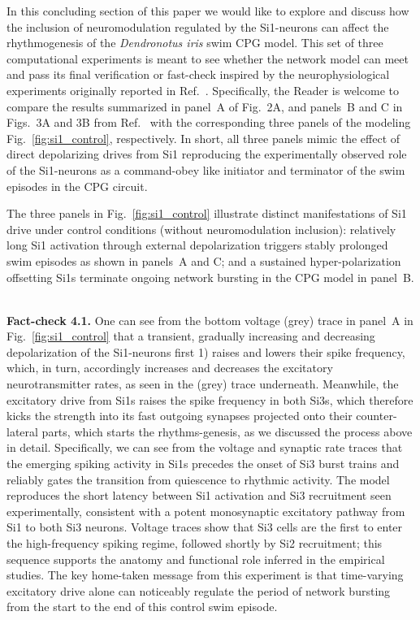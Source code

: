 \documentclass[nofootinbib,aip,amsmath,amssymb,reprint,twocolumn,10pt]{revtex4-2}
\begin{document}
In this concluding section of this paper we would like to explore and discuss how the inclusion of 
neuromodulation regulated by the Si1-neurons can affect the rhythmogenesis of the {\textit{Dendronotus iris}} 
swim CPG model. This set of three computational experiments is meant to see whether the network model can meet and pass its final verification or fast-check inspired by the neurophysiological experiments originally reported in Ref.~\cite{sakurai2019command}. Specifically, the Reader is welcome to compare the results summarized in panel~A of Fig.~2A, and panels~B and C in Figs.~3A and 3B from Ref.~\cite{sakurai2019command} with the  corresponding three panels of the modeling Fig.~\ref{fig:si1_control}, respectively.  In short, all three panels mimic the effect of direct depolarizing drives from Si1 reproducing the experimentally observed role of the Si1-neurons as a command-obey like initiator and terminator of the swim episodes in the CPG circuit. 

The three panels in Fig.~\ref{fig:si1_control} illustrate distinct manifestations of Si1 drive under control conditions (without neuromodulation inclusion): relatively long Si1 activation through external depolarization  triggers stably prolonged swim episodes  as shown in panels~A and C; and a sustained hyper-polarization offsetting Si1s terminate ongoing network bursting in the CPG model in panel~B.

~\\
{\bf Fact-check 4.1.} One can see from the bottom voltage (grey) trace in panel~A in Fig.~\ref{fig:si1_control} that a transient, gradually increasing and decreasing depolarization of the Si1-neurons first 1) raises and lowers their spike frequency, which, in turn, accordingly increases and decreases the excitatory neurotransmitter rates, as seen in the (grey) trace underneath. Meanwhile, the excitatory drive from Si1s raises the spike frequency in both Si3s, which therefore kicks the strength into  its fast outgoing synapses projected onto their counter-lateral parts, which starts the rhythms-genesis, as we discussed the process above in detail. Specifically, we can see from the voltage and synaptic rate traces that the emerging spiking activity in Si1s precedes the onset of Si3 burst trains and reliably gates the transition from quiescence to rhythmic activity. The model reproduces the short latency between Si1 activation and Si3 recruitment seen experimentally, consistent with a potent monosynaptic excitatory pathway from Si1 to both Si3 neurons. Voltage traces show that Si3 cells are the first to enter the high-frequency spiking regime, followed shortly by Si2 recruitment; this sequence supports the anatomy and functional role inferred in the empirical studies. The key home-taken message from this experiment is that time-varying excitatory drive alone can noticeably regulate the period of network bursting from the start to the end of this control swim episode.
\end{document}
